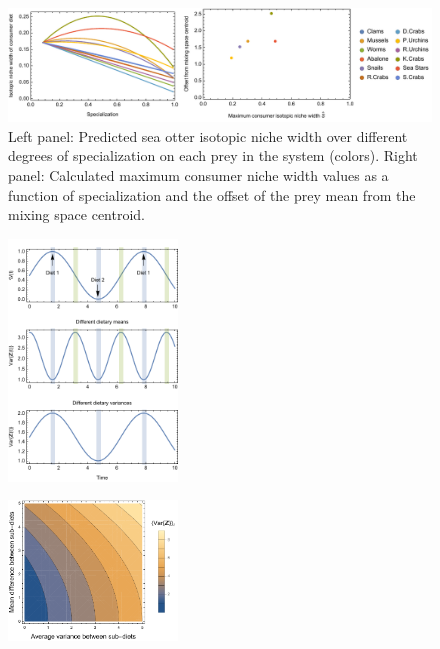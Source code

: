 \documentclass{frontiersSCNS}
\begin{document}
\begin{figure}[h!]
\centering
\includegraphics[width=1\textwidth]{fig_ottervar.pdf}
\caption{
Left panel: Predicted sea otter isotopic niche width over different degrees of specialization on each prey in the system (colors).
Right panel: Calculated maximum consumer niche width values as a function of specialization and the offset of the prey mean from the mixing space centroid.
}
  \label{figottervar}
\end{figure}

\begin{figure}[h!]
\centering
\includegraphics[width=0.4\textwidth]{fig_varZt.pdf}
\caption{
}
  \label{figvarZt}
\end{figure}

\begin{figure}[h!]
\centering
\includegraphics[width=0.4\textwidth]{fig_varzContour.pdf}
\caption{
}
  \label{figvarcont}
\end{figure}
\end{document}
